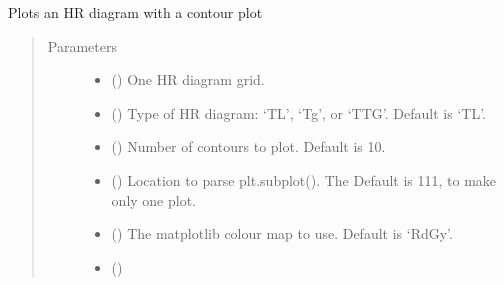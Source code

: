\documentclass[letterpaper,10pt,english]{sphinxmanual}
\begin{document}
\begin{fulllineitems}
\label{\detokenize{hrdiagrams:hoki.hrdiagrams.plot_hrdiagram}}
Plots an HR diagram with a contour plot
\begin{quote}\begin{description}
\item[{Parameters}] \leavevmode\begin{itemize}
\item {} 
 (\sphinxstyleliteralemphasis{\sphinxupquote{ (}}\sphinxstyleliteralemphasis{\sphinxupquote{)}}) \textendash{} One HR diagram grid.

\item {} 
 (\sphinxstyleliteralemphasis{\sphinxupquote{, }}) \textendash{} Type of HR diagram: ‘TL’, ‘Tg’, or ‘TTG’. Default is ‘TL’.

\item {} 
 (\sphinxstyleliteralemphasis{\sphinxupquote{, }}) \textendash{} Number of contours to plot. Default is 10.

\item {} 
 (\sphinxstyleliteralemphasis{\sphinxupquote{, }}) \textendash{} Location to parse plt.subplot(). The Default is 111, to make only one plot.

\item {} 
 (\sphinxstyleliteralemphasis{\sphinxupquote{, }}) \textendash{} The matplotlib colour map to use. Default is ‘RdGy’.

\item {} 
 () \textendash{} 


\end{itemize}
\end{description}
\end{quote}
\end{fulllineitems}
\end{document}
